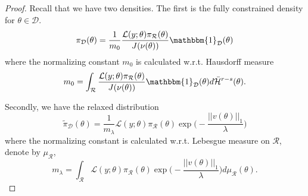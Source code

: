 \documentclass[10pt,fleqn]{article}
\DeclareMathOperator{\1}{\mathbbm{1}}
\begin{document}
\begin{proof}
Recall that we have two densities. The first is the fully constrained density for $\theta\in\mathcal{D}$.
\begin{equation*}
\pi_\mathcal{D}(\theta) = \frac{1}{m_0} \frac{\mathcal{L}(y;\theta)\pi_\mathcal{R}(\theta)}{J(\nu(\theta))}\mathbbm{1}_\mathcal{D}(\theta)
\end{equation*}
where the normalizing constant $m_0$ is calculated w.r.t. Hausdorff measure
$$m_0 = \int_\mathcal{R} \frac{\mathcal{L}(y;\theta)\pi_\mathcal{R}(\theta)}{J(\nu(\theta))}\mathbbm{1}_\mathcal{D}(\theta)d\bar{\mathcal{H}}^{r-s}(\theta).$$

Secondly, we have the relaxed distribution
$$\tilde{\pi}_\mathcal{D}(\theta) = \frac{1}{m_\lambda} \mathcal{L}(y;\theta)\pi_\mathcal{R}(\theta)\exp\bigg(-\frac{||v(\theta)||_1}{\lambda}\bigg)$$
where the normalizing constant is calculated w.r.t. Lebesgue measure on $\mathcal{R}$, denote by $\mu_\mathcal{R}$,
$$m_\lambda = \int_\mathcal{R}\mathcal{L}(y;\theta)\pi_\mathcal{R}(\theta)\exp\bigg(-\frac{||v(\theta)||_1}{\lambda}\bigg) d\mu_\mathcal{R}(\theta).$$



\end{proof}
\end{document}
